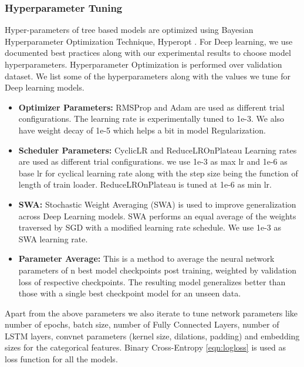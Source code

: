 \subsubsection{Hyperparameter Tuning}
Hyper-parameters of tree based models are optimized
using Bayesian Hyperparameter Optimization Technique, Hyperopt \cite{bergstra2013hyperopt}. 
For Deep learning, we use documented best practices along with our experimental results to
choose model hyperparameters. Hyperparameter Optimization is performed over validation dataset. 
We list some of the hyperparameters along with the values we tune for Deep learning models.
  \begin{itemize}
    \item {\bf Optimizer Parameters:} RMSProp \cite{bengio2015rmsprop} and Adam are used as different trial configurations. 
    The learning rate is experimentally tuned to 1e-3. We also have weight decay of 1e-5 which helps a bit in model Regularization.
    \item {\bf Scheduler Parameters:} CyclicLR \cite{smith2017cyclical} and ReduceLROnPlateau \cite{zaheer2018adaptive} 
    Learning rates are used as different trial configurations.
    we use 1e-3 as max lr and 1e-6 as base lr for cyclical learning rate along with the step size being the function of
    length of train loader. ReduceLROnPlateau is tuned at 1e-6 as min lr.
    \item {\bf SWA:} Stochastic Weight Averaging (SWA) \cite{izmailov2018averaging} is used to improve generalization across Deep Learning
    models. SWA performs an equal average of the weights traversed by SGD with a modified learning rate schedule. We use 
    1e-3 as SWA learning rate.
    \item {\bf Parameter Average:} This is a method to average the neural network parameters of n best model checkpoints 
    post training, weighted by validation loss of respective checkpoints. The resulting model generalizes better than those 
    with a single best checkpoint model for an unseen data. 
  \end{itemize}
Apart from the above parameters we also iterate to tune network parameters like number of epochs, batch size, 
number of Fully Connected Layers, number of LSTM layers, convnet parameters (kernel size, dilations, padding)
and embedding sizes for the categorical features. Binary Cross-Entropy \ref{eqn:logloss} is used as loss 
function for all the models.
